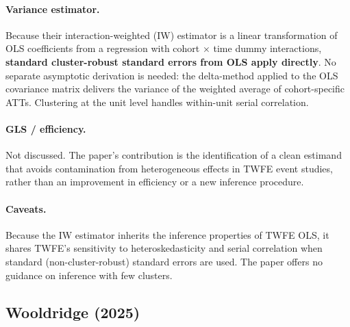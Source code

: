 \documentclass[12pt]{article}
\begin{document}
\paragraph{Variance estimator.}
Because their interaction-weighted (IW) estimator is a linear transformation of
OLS coefficients from a regression with cohort $\times$ time dummy interactions,
\textbf{standard cluster-robust standard errors from OLS apply directly}.
No separate asymptotic derivation is needed: the delta-method applied to the
OLS covariance matrix delivers the variance of the weighted average of
cohort-specific ATTs.
Clustering at the unit level handles within-unit serial correlation.

\paragraph{GLS / efficiency.}
Not discussed.
The paper's contribution is the identification of a clean estimand that avoids
contamination from heterogeneous effects in TWFE event studies, rather than
an improvement in efficiency or a new inference procedure.

\paragraph{Caveats.}
Because the IW estimator inherits the inference properties of TWFE OLS,
it shares TWFE's sensitivity to heteroskedasticity and serial correlation
when standard (non-cluster-robust) standard errors are used.
The paper offers no guidance on inference with few clusters.

\subsection{Wooldridge (2025)}
\end{document}
